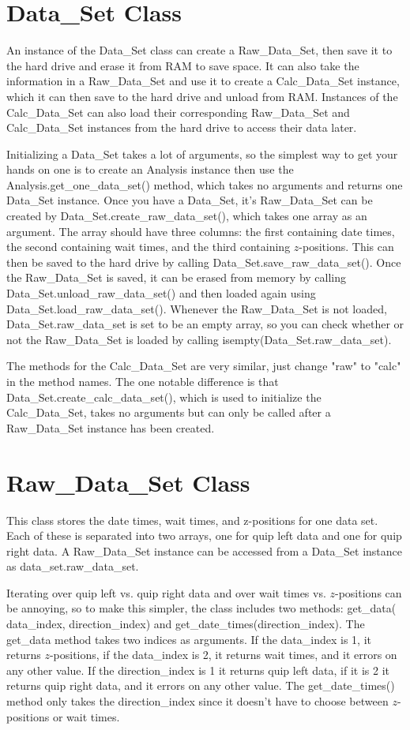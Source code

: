 \documentclass[12pt]{report}
\begin{document}
\section{Data\_Set Class}
An instance of the Data\_Set class can create a Raw\_Data\_Set, then save it to the hard drive and erase it from RAM to save space.  It can also take the information in a Raw\_Data\_Set and use it to create a Calc\_Data\_Set instance, which it can then save to the hard drive and unload from RAM.  Instances of the Calc\_Data\_Set can also load their corresponding Raw\_Data\_Set and Calc\_Data\_Set instances from the hard drive to access their data later.

Initializing a Data\_Set takes a lot of arguments, so the simplest way to get your hands on one is to create an Analysis instance then use the Analysis.get\_one\_data\_set() method, which takes no arguments and returns one Data\_Set instance.  Once you have a Data\_Set, it's Raw\_Data\_Set can be created by Data\_Set.create\_raw\_data\_set(), which takes one array as an argument.  The array should have three columns: the first containing date times, the second containing wait times, and the third containing $z$-positions.  This can then be saved to the hard drive by calling Data\_Set.save\_raw\_data\_set().   Once the Raw\_Data\_Set is saved, it can be erased from memory by calling Data\_Set.unload\_raw\_data\_set() and then loaded again using Data\_Set.load\_raw\_data\_set().  Whenever the Raw\_Data\_Set is not loaded, Data\_Set.raw\_data\_set is set to be an empty array, so you can check whether or not the Raw\_Data\_Set is loaded by calling isempty(Data\_Set.raw\_data\_set).

The methods for the Calc\_Data\_Set are very similar, just change "raw" to "calc" in the method names.  The one notable difference is that Data\_Set.create\_calc\_data\_set(), which is used to initialize the Calc\_Data\_Set, takes no arguments but can only be called after a Raw\_Data\_Set instance has been created.

\section{Raw\_Data\_Set Class}
This class stores the date times, wait times, and z-positions for one data set.  Each of these is separated into two arrays, one for quip left data and one for quip right data.  A Raw\_Data\_Set instance can be accessed from a Data\_Set instance as data\_set.raw\_data\_set.

Iterating over quip left vs. quip right data and over wait times vs. $z$-positions can be annoying, so to make this simpler, the class includes two methods: get\_data( data\_index, direction\_index) and get\_date\_times(direction\_index).  The get\_data method takes two indices as arguments.  If the data\_index is 1, it returns $z$-positions, if the data\_index is 2, it returns wait times, and it errors on any other value.  If the direction\_index is 1 it returns quip left data, if it is 2 it returns quip right data, and it errors on any other value.  The get\_date\_times() method only takes the direction\_index since it doesn't have to choose between $z$-positions or wait times.
\end{document}
